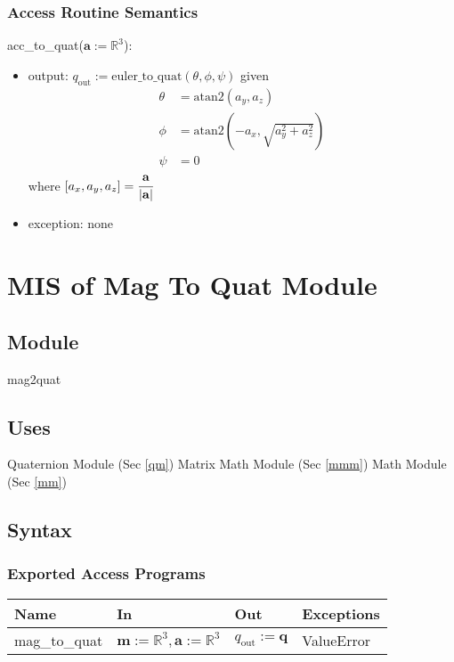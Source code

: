 \documentclass[12pt, titlepage]{article}
\begin{document}
\subsubsection{Access Routine Semantics}

\noindent acc\_to\_quat($\mathbf{a}:=\mathbb{R}^3$):
\begin{itemize}
\item output: $q_\text{out}:= \text{euler\_to\_quat}(\theta, \phi, \psi)$ given
\begin{align*}
  \theta &= \text{atan2}(a_y, a_z) \\
  \phi &= \text{atan2}(-a_x, \sqrt{a_y^2+a_z^2}) \\
  \psi &= 0
\end{align*}
where $[a_x, a_y, a_z] = \cfrac{\mathbf{a}}{|\mathbf{a}|}$
\item exception: none
\end{itemize}

\newpage

\section{MIS of Mag To Quat Module} \label{iqewmm}

\subsection{Module}
mag2quat

\subsection{Uses}
Quaternion Module (Sec \ref{qm})\newline
Matrix Math Module (Sec \ref{mmm}) \newline
Math Module (Sec \ref{mm})

\subsection{Syntax}

\subsubsection{Exported Access Programs}

\begin{center}
\begin{tabular}{p{3cm} p{4cm} p{3cm} p{2cm}}
\hline
\textbf{Name} & \textbf{In} & \textbf{Out} & \textbf{Exceptions} \\
\hline
mag\_to\_quat & $\mathbf{m}:=\mathbb{R}^3, \mathbf{a}:=\mathbb{R}^3$ & $q_\text{out} := \mathbf{q}$
& ValueError \\
\hline
\end{tabular}
\end{center}
\end{document}
